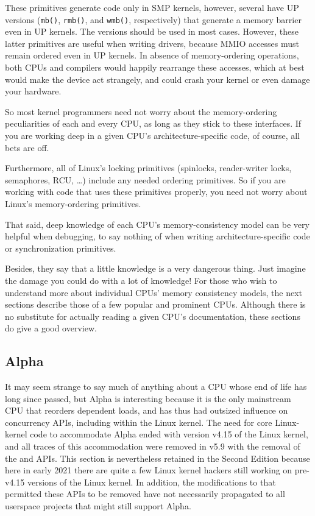 These primitives generate code only in SMP kernels, however, several
have UP versions ({\tt mb()}, {\tt rmb()}, and {\tt wmb()},
respectively) that generate a memory barrier even in UP kernels.
The  versions should be used in most cases.
However, these latter primitives are useful when writing drivers,
because MMIO accesses must remain ordered even in UP kernels.
In absence of memory-ordering operations, both CPUs and compilers would
happily rearrange these accesses, which at best would make the device
act strangely, and could crash your kernel or even damage your hardware.

So most kernel programmers need not worry about the memory-ordering
peculiarities of each and every CPU, as long as they stick to these
interfaces.
If you are working deep in a given CPU's architecture-specific code,
of course, all bets are off.

Furthermore,
all of Linux's locking primitives (spinlocks, reader-writer locks,
semaphores, RCU, \ldots) include any needed ordering primitives.
So if you are working with code that uses these primitives properly,
you need not worry about Linux's memory-ordering primitives.

That said, deep knowledge of each CPU's memory-consistency model
can be very helpful when debugging, to say nothing of when writing
architecture-specific code or synchronization primitives.

Besides, they say that a little knowledge is a very dangerous thing.
Just imagine the damage you could do with a lot of knowledge!
For those who wish to understand more about individual CPUs'
memory consistency models, the next sections describe those of a few
popular and prominent CPUs.
Although there is no substitute for actually reading a given CPU's
documentation, these sections do give a good overview.

\subsection{Alpha}
\label{sec:memorder:Alpha}

It may seem strange to say much of anything about a CPU whose end of life
has long since passed, but Alpha is interesting because it is the only
mainstream CPU that reorders dependent loads, and has thus had outsized
influence on concurrency APIs, including within the Linux kernel.
The need for core Linux-kernel code to accommodate Alpha ended
with version v4.15 of the Linux kernel, and all traces of this
accommodation were removed in v5.9 with the removal of the
 and  APIs.
This section is nevertheless retained in the Second Edition
because here in early 2021 there are quite a few Linux kernel hackers
still working on pre-v4.15 versions of the Linux kernel.
In addition, the modifications to  that permitted
these APIs to be removed have not necessarily propagated to all
userspace projects that might still support Alpha.

